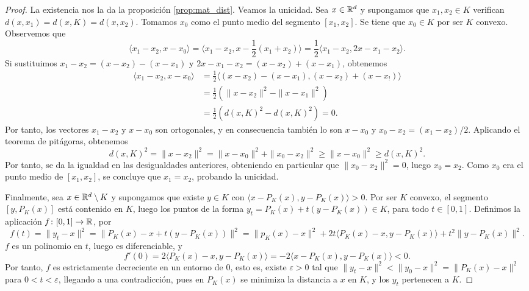 \begin{proof}
    La existencia nos la da la proposición \ref{prop:mat_dist}. Veamos la unicidad. Sea $x \in \mathbb{R}^d$ y supongamos que $x_1,x_2 \in K$ verifican $d(x,x_1) = d(x,K) = d(x,x_2)$. Tomamos $x_0$ como el punto medio del segmento $[x_1,x_2]$. Se tiene que $x_0 \in K$ por ser $K$ convexo. Observemos que
    \[\langle x_1 - x_2, x - x_0 \rangle = \langle x_1 - x_2, x - \frac{1}{2}(x_1 + x_2) \rangle = \frac{1}{2}\langle x_1 - x_2, 2x - x_1 - x_2 \rangle.\]
    Si sustituimos $x_1 - x_2 = (x - x_2) - (x - x_1)$ y $2x - x_1 - x_2 = (x-x_2)+(x-x_1)$, obtenemos
    \begin{align*}
        \langle x_1 - x_2, x - x_0 \rangle &= \frac{1}{2} \langle (x - x_2) - (x-x_1), (x - x_2)+(x - x_!) \rangle\\
                                           &= \frac{1}{2}(\|x - x_2\|^2 - \|x - x_1\|^2) \\
                                           &= \frac{1}{2}(d(x,K)^2 - d(x,K)^2) = 0.
    \end{align*}
    Por tanto, los vectores $x_1 - x_2$ y $x - x_0$ son ortogonales, y en consecuencia también lo son $x - x_0$ y $x_0 - x_2 = (x_1 - x_2)/2$. Aplicando el teorema de pitágoras, obtenemos
    \[d(x,K)^2 = \|x - x_2\|^2 =  \|x - x_0\|^2 + \|x_0 - x_2\|^2 \ge \|x - x_0\|^2 \ge d(x,K)^2.\]
    Por tanto, se da la igualdad en las desigualdades anteriores, obteniendo en particular que $\|x_0 - x_2\|^2 = 0$, luego $x_0 = x_2$. Como $x_0$ era el punto medio de $[x_1,x_2]$, se concluye que $x_1 = x_2$, probando la unicidad.

    Finalmente, sea $x \in \mathbb{R}^d \setminus K$ y supongamos que existe $y \in K$ con $\langle x - P_K(x), y - P_K(x) \rangle > 0$. Por ser $K$ convexo, el segmento $[y,P_K(x)]$ está contenido en $K$, luego los puntos de la forma $y_t = P_K(x) + t(y - P_K(x)) \in K$, para todo $t \in [0,1]$. Definimos la aplicación $f \colon [0,1] \to \mathbb{R}$, por
    \[f(t) = \|y_t - x\|^2 = \|P_K(x) -x  + t(y - P_K(x))\|^2 = \|p_K(x) - x \|^2 + 2t\langle P_K(x)-x,y-P_K(x) \rangle + t^2\|y - P_K(x)\|^2. \]
    $f$ es un polinomio en $t$, luego es diferenciable, y
    \[f'(0) = 2\langle P_K(x)-x,y-P_K(x) \rangle = -2 \langle x - P_K(x), y - P_K(x) \rangle < 0.\]
    Por tanto, $f$ es estrictamente decreciente en un entorno de 0, esto es, existe $\varepsilon > 0$ tal que $\|y_t - x\|^2 < \|y_0 - x \|^2 = \|P_K(x) - x\|^2$ para $0 < t < \varepsilon$, llegando a una contradicción, pues en $P_K(x)$ se minimiza la distancia a $x$ en $K$, y los $y_t$ pertenecen a $K$.
\end{proof}

